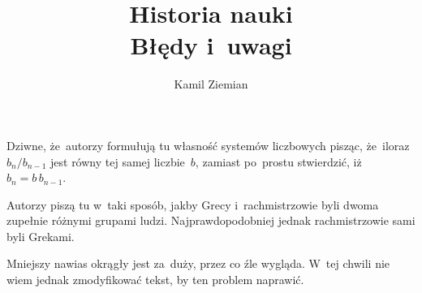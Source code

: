 \documentclass[a4paper,11pt]{article}
\title{Historia nauki \\
  {\Large Błędy i~uwagi}}
\author{Kamil Ziemian}
\begin{document}



\maketitle %




\vspace{0em}



\vspace{0em}


\noindent
{} Dziwne, że~autorzy formułują tu własność systemów
liczbowych pisząc, że~iloraz $b_{ n } / b_{ n - 1 }$ jest równy tej
samej liczbie~$b$, zamiast po~prostu stwierdzić,
iż~$b_{ n } = b \, b_{ n - 1 }$.

\vspace{\spaceFour}





\noindent
{} Autorzy piszą tu w~taki sposób, jakby Grecy
i~rachmistrzowie byli dwoma zupełnie różnymi grupami ludzi.
Najprawdopodobniej jednak rachmistrzowie sami byli Grekami.

\vspace{\spaceFour}





\noindent
{} Mniejszy nawias okrągły jest za~duży, przez co źle wygląda.
W~tej chwili nie wiem jednak zmodyfikować tekst, by ten problem naprawić.





\newpage

\end{document}
